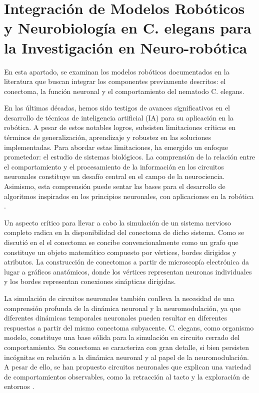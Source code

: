 \section{Integración de Modelos Robóticos y Neurobiología en C. elegans para la Investigación en Neuro-robótica}
\label{sec:neurorobot}
En esta apartado, se examinan  los modelos robóticos documentados en la literatura que buscan integrar los componentes previamente descritos: el conectoma, la función neuronal y el comportamiento del nematodo C. elegans.

En las últimas décadas, hemos sido testigos de avances significativos en el desarrollo de técnicas de inteligencia artificial (IA) para su aplicación en la robótica. A pesar de estos notables logros, subsisten limitaciones críticas en términos de generalización, aprendizaje y robustez en las soluciones implementadas. Para abordar estas limitaciones, ha emergido un enfoque prometedor: el estudio de sistemas biológicos. La comprensión de la relación entre el comportamiento y el procesamiento de la información en los circuitos neuronales constituye un desafío central en el campo de la neurociencia. Asimismo, esta comprensión puede sentar las bases para el desarrollo de algoritmos inspirados en los principios neuronales, con aplicaciones en la robótica \cite{norman-tenazas_worminator_2018}.


Un aspecto crítico para llevar a cabo la simulación de un sistema nervioso completo radica en la disponibilidad del conectoma de dicho sistema. Como se discutió en el  el conectoma se concibe convencionalmente como un grafo que constituye un objeto matemático compuesto por vértices, bordes dirigidos y atributos. La construcción de conectomas a partir de microscopía electrónica da lugar a gráficos anatómicos, donde los vértices representan neuronas individuales y los bordes representan conexiones sinápticas dirigidas.


La simulación de circuitos neuronales también conlleva la necesidad de una comprensión profunda de la dinámica neuronal y la neuromodulación, ya que diferentes dinámicas temporales neuronales pueden resultar en diferentes respuestas a partir del mismo conectoma subyacente. C. elegans, como organismo modelo, constituye una base sólida para la simulación en circuito cerrado del comportamiento. Su conectoma se caracteriza con gran detalle, si bien persisten incógnitas en relación a la dinámica neuronal y al papel de la neuromodulación. A pesar de ello, se han propuesto circuitos neuronales que explican una variedad de comportamientos observables, como la retracción al tacto y la exploración de entornos \cite{bargmann_chemosensation_2006}.


